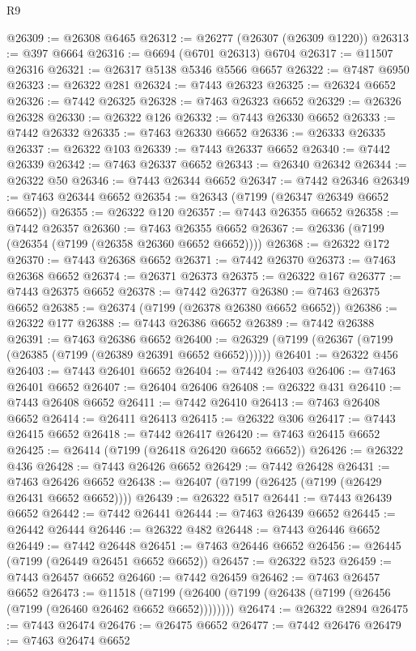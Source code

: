 \begin{lexlean}{R9}
\begin{coremodule}
{{{{{{{{{{{{{{{{{{{{{{{{{{{{{{{{{{{{{{{{{{{{{{{{{{{{{{{{{{{{{{{{{{{{{{{{{{{{{{{{{{{{@26309 := @26308 @6465
@26312 := @26277 (@26307 (@26309 @1220))
@26313 := @397 @6664
@26316 := @6694 (@6701 @26313) @6704
@26317 := @11507 @26316
@26321 := @26317 @5138 @5346 @5566 @6657
@26322 := @7487 @6950
@26323 := @26322 @281
@26324 := @7443 @26323
@26325 := @26324 @6652
@26326 := @7442 @26325
@26328 := @7463 @26323 @6652
@26329 := @26326 @26328
@26330 := @26322 @126
@26332 := @7443 @26330 @6652
@26333 := @7442 @26332
@26335 := @7463 @26330 @6652
@26336 := @26333 @26335
@26337 := @26322 @103
@26339 := @7443 @26337 @6652
@26340 := @7442 @26339
@26342 := @7463 @26337 @6652
@26343 := @26340 @26342
@26344 := @26322 @50
@26346 := @7443 @26344 @6652
@26347 := @7442 @26346
@26349 := @7463 @26344 @6652
@26354 := @26343 (@7199 (@26347 @26349 @6652 @6652))
@26355 := @26322 @120
@26357 := @7443 @26355 @6652
@26358 := @7442 @26357
@26360 := @7463 @26355 @6652
@26367 := @26336 (@7199 (@26354 (@7199 (@26358 @26360 @6652 @6652))))
@26368 := @26322 @172
@26370 := @7443 @26368 @6652
@26371 := @7442 @26370
@26373 := @7463 @26368 @6652
@26374 := @26371 @26373
@26375 := @26322 @167
@26377 := @7443 @26375 @6652
@26378 := @7442 @26377
@26380 := @7463 @26375 @6652
@26385 := @26374 (@7199 (@26378 @26380 @6652 @6652))
@26386 := @26322 @177
@26388 := @7443 @26386 @6652
@26389 := @7442 @26388
@26391 := @7463 @26386 @6652
@26400 := @26329 (@7199 (@26367 (@7199 (@26385 (@7199 (@26389 @26391 @6652 @6652))))))
@26401 := @26322 @456
@26403 := @7443 @26401 @6652
@26404 := @7442 @26403
@26406 := @7463 @26401 @6652
@26407 := @26404 @26406
@26408 := @26322 @431
@26410 := @7443 @26408 @6652
@26411 := @7442 @26410
@26413 := @7463 @26408 @6652
@26414 := @26411 @26413
@26415 := @26322 @306
@26417 := @7443 @26415 @6652
@26418 := @7442 @26417
@26420 := @7463 @26415 @6652
@26425 := @26414 (@7199 (@26418 @26420 @6652 @6652))
@26426 := @26322 @436
@26428 := @7443 @26426 @6652
@26429 := @7442 @26428
@26431 := @7463 @26426 @6652
@26438 := @26407 (@7199 (@26425 (@7199 (@26429 @26431 @6652 @6652))))
@26439 := @26322 @517
@26441 := @7443 @26439 @6652
@26442 := @7442 @26441
@26444 := @7463 @26439 @6652
@26445 := @26442 @26444
@26446 := @26322 @482
@26448 := @7443 @26446 @6652
@26449 := @7442 @26448
@26451 := @7463 @26446 @6652
@26456 := @26445 (@7199 (@26449 @26451 @6652 @6652))
@26457 := @26322 @523
@26459 := @7443 @26457 @6652
@26460 := @7442 @26459
@26462 := @7463 @26457 @6652
@26473 := @11518
    (@7199 (@26400 (@7199 (@26438 (@7199 (@26456 (@7199 (@26460 @26462 @6652 @6652))))))))
@26474 := @26322 @2894
@26475 := @7443 @26474
@26476 := @26475 @6652
@26477 := @7442 @26476
@26479 := @7463 @26474 @6652
}}}}}}}}}}}}}}}}}}}}}}}}}}}}}}}}}}}}}}}}}}}}}}}}}}}}}}}}}}}}}}}}}}}}}}}}}}}}}}}}}}}}
\end{coremodule}
\end{lexlean}

